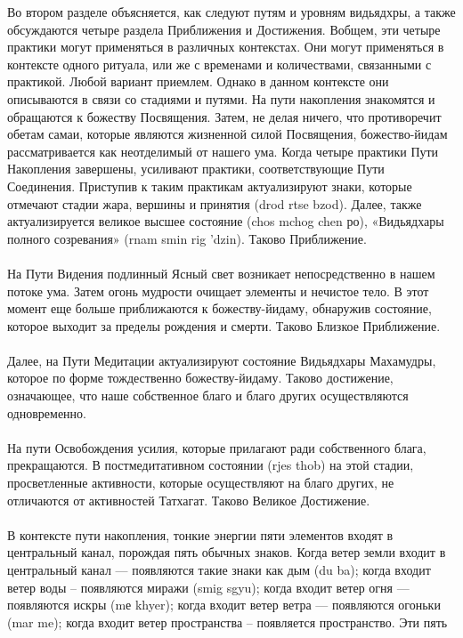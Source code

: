 \begin{siderules}
Во втором разделе объясняется, как следуют путям и уровням видьядхры, а также
обсуждаются четыре раздела Приближения и Достижения. Вобщем, эти четыре практики
могут применяться в различных контекстах. Они могут применяться в контексте одного
ритуала, или же с временами и количествами, связанными с практикой. Любой вариант
приемлем. Однако в данном контексте они описываются в связи со стадиями и путями.
На пути накопления знакомятся и обращаются к божеству Посвящения. Затем, не делая
ничего, что противоречит обетам самаи, которые являются жизненной силой Посвящения,
божество-йидам рассматривается как неотделимый от нашего ума. Когда четыре практики
Пути Накопления завершены, усиливают практики, соответствующие Пути Соединения.
Приступив к таким практикам актуализируют знаки, которые отмечают стадии жара,
вершины и принятия (drod rtse bzod). Далее, также актуализируется великое высшее
состояние (chos mchog chen ро), «Видьядхары полного созревания» (rnam smin rig 'dzin).
Таково Приближение.\\
\\
На Пути Видения подлинный Ясный свет возникает непосредственно в нашем потоке ума.
Затем огонь мудрости очищает элементы и нечистое тело. В этот момент еще больше
приближаются к божеству-йидаму, обнаружив состояние, которое выходит за пределы
рождения и смерти. Таково Близкое Приближение.\\
\\
Далее, на Пути Медитации актуализируют состояние Видьядхары Махамудры, которое по
форме тождественно божеству-йидаму. Таково достижение, означающее, что наше
собственное благо и благо других осуществляются одновременно.\\
\\
На пути Освобождения усилия, которые прилагают ради собственного блага, прекращаются.
В постмедитативном состоянии (rjes thob) на этой стадии, просветленные активности,
которые осуществляют на благо других, не отличаются от активностей Татхагат. Таково
Великое Достижение.\\
\\
В контексте пути накопления, тонкие энергии пяти элементов входят в центральный канал,
порождая пять обычных знаков. Когда ветер земли входит в центральный канал — появляются
такие знаки как дым (du ba); когда входит ветер воды -- появляются миражи (smig sgyu); когда
входит ветер огня — появляются искры (mе khyer); когда входит ветер ветра — появляются
огоньки (mar me); когда входит ветер пространства -- появляется пространство. Эти пять

\end{siderules}
